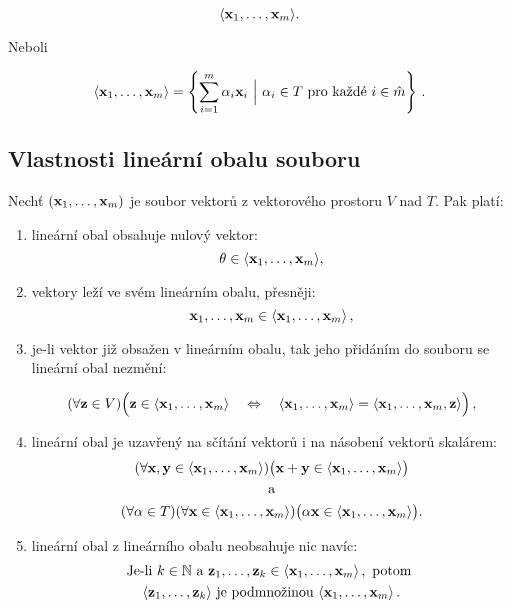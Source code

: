 \[ \langle  \mathbf{x}_{1},\dots,\mathbf{x}_{m}  \rangle . \]

\noindent Neboli

\[ \langle  \mathbf{x}_{1},\dots,\mathbf{x}_{m}  \rangle = \left\{\sum_{i=1}^m \alpha_i \mathbf{x}_i \ \Big|\ \alpha_i\in T \text{ pro každé }i \in \hat m \right\}\,. \]

\subsection*{Vlastnosti lineární obalu souboru}

Nechť $(\mathbf{x}_1,\ldots,\mathbf{x}_m)$ je soubor vektorů z vektorového prostoru $V$ nad
$T$. Pak platí:

\begin{enumerate}
      \item lineární obal obsahuje nulový vektor:
            \[ \theta\in \langle \mathbf{x}_1,\ldots,\mathbf{x}_m \rangle , \]
      \item vektory leží ve svém lineárním obalu, přesněji:
            \[ \mathbf{x}_1,\ldots,\mathbf{x}_m  \in  \langle \mathbf{x}_1,\ldots,\mathbf{x}_m \rangle\,, \]
      \item je-li vektor již obsažen v lineárním obalu, tak jeho přidáním do souboru se
            lineární obal nezmění:

            \[ (\forall \mathbf{z}\in V)\Big(\mathbf{z}\in\langle \mathbf{x}_1,\ldots,\mathbf{x}_m \rangle   \quad \Leftrightarrow \quad \langle  \mathbf{x}_1,\ldots,\mathbf{x}_m  \rangle =\langle  \mathbf{x}_1,\ldots,\mathbf{x}_m,\mathbf{z}  \rangle\Big)\,, \]

      \item lineární obal je uzavřený na sčítání vektorů i na násobení vektorů skalárem:
            \begin{gather*}
                  (\forall\mathbf{x},\mathbf{y}\in\langle  \mathbf{x}_1,\ldots,\mathbf{x}_m \rangle)\big(\mathbf{x}+\mathbf{y}\in\langle \mathbf{x}_1,\ldots,\mathbf{x}_m \rangle\big)\\
                  \quad\text{a}\quad\\
                  (\forall\alpha\in T)(\forall\mathbf{x}\in\langle \mathbf{x}_1,\ldots,\mathbf{x}_m \rangle)\big(\alpha \mathbf{x}\in\langle \mathbf{x}_1,\ldots,\mathbf{x}_m \rangle\big) .
            \end{gather*}
      \item lineární obal z lineárního obalu neobsahuje nic navíc:
            \begin{gather*}
                  \text{Je-li } k\in \mathbb{N} \text{ a } \mathbf{z}_1,\dots, \mathbf{z}_k\in\langle  \mathbf{x}_1,\ldots,\mathbf{x}_m \rangle\,,\text{ potom }\\
                  \langle  \mathbf{z}_1,\ldots,\mathbf{z}_k  \rangle \text{ je podmnožinou } \langle  \mathbf{x}_1,\ldots,\mathbf{x}_m \rangle\,.
            \end{gather*}
\end{enumerate}

